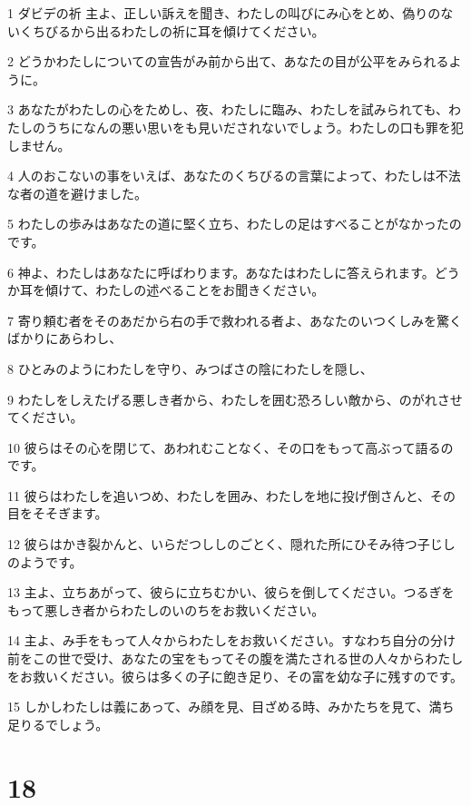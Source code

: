 \par 1 ダビデの祈 主よ、正しい訴えを聞き、わたしの叫びにみ心をとめ、偽りのないくちびるから出るわたしの祈に耳を傾けてください。
\par 2 どうかわたしについての宣告がみ前から出て、あなたの目が公平をみられるように。
\par 3 あなたがわたしの心をためし、夜、わたしに臨み、わたしを試みられても、わたしのうちになんの悪い思いをも見いだされないでしょう。わたしの口も罪を犯しません。
\par 4 人のおこないの事をいえば、あなたのくちびるの言葉によって、わたしは不法な者の道を避けました。
\par 5 わたしの歩みはあなたの道に堅く立ち、わたしの足はすべることがなかったのです。
\par 6 神よ、わたしはあなたに呼ばわります。あなたはわたしに答えられます。どうか耳を傾けて、わたしの述べることをお聞きください。
\par 7 寄り頼む者をそのあだから右の手で救われる者よ、あなたのいつくしみを驚くばかりにあらわし、
\par 8 ひとみのようにわたしを守り、みつばさの陰にわたしを隠し、
\par 9 わたしをしえたげる悪しき者から、わたしを囲む恐ろしい敵から、のがれさせてください。
\par 10 彼らはその心を閉じて、あわれむことなく、その口をもって高ぶって語るのです。
\par 11 彼らはわたしを追いつめ、わたしを囲み、わたしを地に投げ倒さんと、その目をそそぎます。
\par 12 彼らはかき裂かんと、いらだつししのごとく、隠れた所にひそみ待つ子じしのようです。
\par 13 主よ、立ちあがって、彼らに立ちむかい、彼らを倒してください。つるぎをもって悪しき者からわたしのいのちをお救いください。
\par 14 主よ、み手をもって人々からわたしをお救いください。すなわち自分の分け前をこの世で受け、あなたの宝をもってその腹を満たされる世の人々からわたしをお救いください。彼らは多くの子に飽き足り、その富を幼な子に残すのです。
\par 15 しかしわたしは義にあって、み顔を見、目ざめる時、みかたちを見て、満ち足りるでしょう。

\chapter{18}

